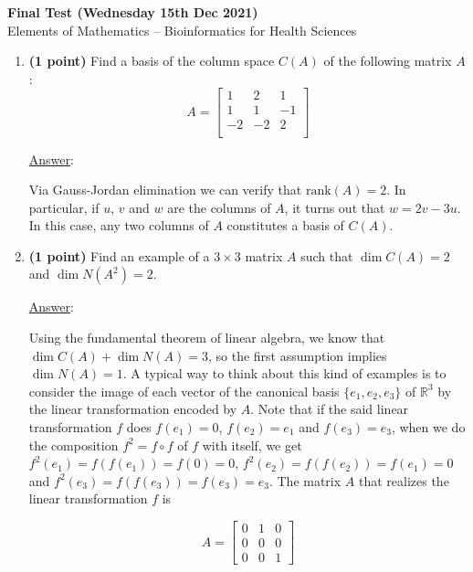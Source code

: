 \documentclass[]{book}
\theoremstyle{definition}
\newcommand{\rank}{\textrm{rank}}
\newcommand\ans{\underline{Answer}: }
\begin{document}


\begin{center}
\textbf{Final Test (Wednesday 15th Dec 2021)}\\
Elements of Mathematics -- Bioinformatics for Health Sciences \\
\end{center}

\vspace{0.2 cm}

\begin{enumerate}



\item {\bf (1 point)} Find a basis of the column space $C(A)$ of the following matrix $A$: 
\[
A = \begin{bmatrix}
1 & 2  & 1 \\
1 & 1 & -1 \\
-2 & -2 & 2 \\
\end{bmatrix}
\]

\ans

Via Gauss-Jordan elimination we can verify that $\rank (A) = 2$. In particular, if $u$, $v$ and $w$ are the columns of $A$, it turns out that $w=2v - 3u$. In this case, any two columns of $A$ constitutes a basis of $C(A)$.


\item {\bf (1 point)} Find an example of a $3\times 3$ matrix $A$ such that $\dim C(A) = 2$ and $\dim N(A^2) = 2$.

\ans

Using the fundamental theorem of linear algebra, we know that $\dim C(A) + \dim N(A) = 3$, so the first assumption implies $\dim N(A) = 1$. A typical way to think about this kind of examples is to consider the image of each vector of the canonical basis $\{e_1,e_2,e_3\}$ of 
$\mathbb{R}^3$ by the linear transformation encoded by $A$. Note that if the said linear transformation $f$ does $f(e_1) = 0$, $f(e_2) = e_1$ and $f(e_3) = e_3$, when we do the composition $f^2 = f \circ f$ of $f$ with itself, we get $f^2(e_1) = f(f(e_1)) = f(0) = 0$, $f^2(e_2) = f(f(e_2)) = f(e_1) = 0$ and $f^2(e_3) = f(f(e_3)) = f(e_3) = e_3$. The matrix $A$ that realizes the linear transformation $f$ is

\[
A = \begin{bmatrix}
0 & 1 & 0 \\
0 & 0 & 0 \\
0 & 0 & 1
\end{bmatrix}
\]


\end{enumerate}
\end{document}

